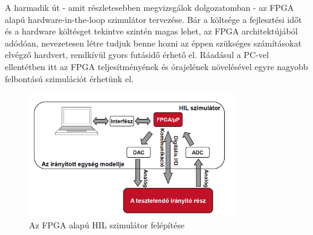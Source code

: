 A harmadik út - amit részletesebben megvizsgálok dolgozatomban - az FPGA alapú hardware-in-the-loop szimulátor tervezése. Bár a költsége a fejlesztési időt és a hardware költésget tekintve szintén magas lehet, az FPGA architektújából adódóan, nevezetesen létre tudjuk benne hozni az éppen szükséges számításokat elvégző hardvert, rendkívül gyors futásidő érhető el. Ráadásul a PC-vel ellentétben itt az FPGA teljesítményének és órajelének növelésével egyre nagyobb felbontású szimulációt érhetünk el.

\begin{figure}[h]
	\centering
	\includegraphics[width = 0.8\textwidth]{figures/hil_idea.png}
	\caption{Az FPGA alapú HIL szimulátor felépítése} 
	\label{fig:hil_idea}
\end{figure}